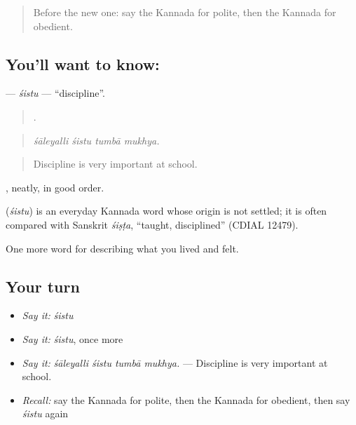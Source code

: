 \label{lesson:KA-C502-sistu}



\begin{quote}
Before the new one: say the Kannada for polite, then the Kannada for obedient.
\end{quote}

\subsection*{You'll want to know: }
\textbf{} — \emph{śistu} — \textquotedblleft{}discipline\textquotedblright{}.

\begin{quote}
   .
\end{quote}

\begin{quote}
\emph{śāleyalli śistu tumbā mukhya.}
\end{quote}

\begin{quote}
Discipline is very important at school.
\end{quote}

, neatly, in good order.

\begin{cousinweb}
\textbf{} (\emph{śistu}) is an everyday Kannada word whose origin is not settled; it is often compared with Sanskrit \emph{śiṣṭa}, \textquotedblleft{}taught, disciplined\textquotedblright{} (CDIAL 12479).
\end{cousinweb}

\begin{grammarlens}[title={What you've built}]
One more word for describing what you lived and felt.
\end{grammarlens}

\subsection*{Your turn}
\begin{itemize}
\raggedright
  \item \emph{Say it:} \emph{śistu}
  \item \emph{Say it:} \emph{śistu}, once more
  \item \emph{Say it:} \emph{śāleyalli śistu tumbā mukhya.} — Discipline is very important at school.
  \item \emph{Recall:} say the Kannada for polite, then the Kannada for obedient, then say \emph{śistu} again
\end{itemize}

